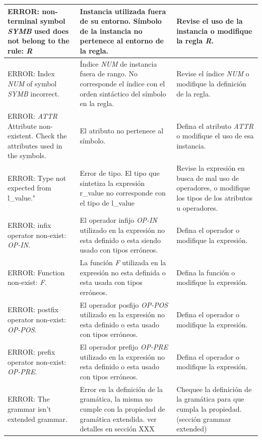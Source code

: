 \begin{small}
\begin{longtable}{| p{5cm} || p{5cm} | p{5cm} |}
ERROR: non-terminal symbol \textit{SYMB} used does not belong to the rule: \textit{R} & Instancia utilizada fuera de su entorno. Símbolo de la instancia no pertenece al entorno de la regla. & Revise el uso de la instancia o modifique la regla \textit{R}.  \\ \hline

ERROR: Index \textit{NUM} of symbol  \textit{SYMB} incorrect. & Índice \textit{NUM} de instancia fuera de rango. No corresponde el índice con el orden sintáctico del símbolo en la regla. & Revise el índice \textit{NUM} o modifique la definición de la regla.  \\ \hline 

ERROR: \textit{ATTR} Attribute non-existent. Check the attributes used in the symbols. & El atributo no pertenece al símbolo. & Defina el atributo \textit{ATTR} o modifique el uso de esa instancia. \\ \hline

ERROR: Type not expected from l\_value." & Error de tipo. El tipo que sintetiza la expresión r\_value no corresponde con el tipo de l\_value & Revise la expresión en busca de mal uso de operadores, o modifique los tipos de los atributos u operadores. \\ \hline
 
ERROR: infix operator non-exist: \textit{OP-IN}. & El operador infijo \textit{OP-IN} utilizado en la expresión no esta definido o esta siendo usado con tipos erróneos. & Defina el operador o modifique la expresión. \\ \hline
 
ERROR: Function non-exist: \textit{F}. & La función \textit{F} utilizada en la expresión no esta definida o esta usada con tipos erróneos. & Defina la función o modifique la expresión. \\ \hline
 
ERROR: postfix operator non-exist: \textit{OP-POS}. & El operador posfijo \textit{OP-POS} utilizado en la expresión no esta definido o esta usado con tipos erróneos. & Defina el operador o modifique la expresión. \\ \hline 

ERROR: prefix operator non-exist: \textit{OP-PRE}. & El operador prefijo \textit{OP-PRE} utilizado en la expresión no esta definido o esta usado con tipos erróneos. & Defina el operador o modifique la expresión. \\ \hline 

ERROR: The grammar isn't extended grammar. & Error en la definición de la gramática, la misma no cumple con la propiedad de gramática extendida. ver detalles en sección XXX & Chequee la definición de la gramática para que cumpla la propiedad.(sección grammar extended) \\ \hline


\end{longtable}
\end{small}
